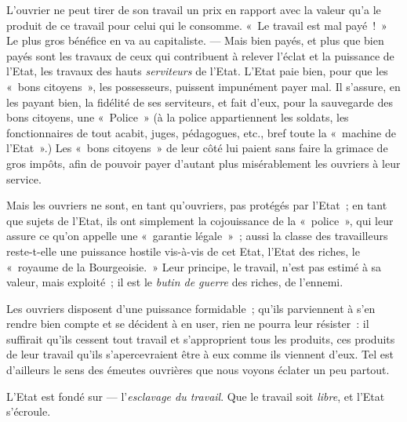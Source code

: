 \documentclass[french,twoside]{book} %
\begin{document}
L’ouvrier ne peut tirer de son travail un prix en rapport avec la valeur qu’a le produit de ce travail pour celui qui le consomme. « Le travail est mal payé ! » Le plus gros bénéfice en va au capitaliste. — Mais bien payés, et plus que bien payés sont les travaux de ceux qui contribuent à relever l’éclat et la puissance de l’Etat, les travaux des hauts \emph{serviteurs} de l’Etat. L’Etat paie bien, pour que les « bons citoyens », les possesseurs, puissent impunément payer mal. Il s’assure, en les payant bien, la fidélité de ses serviteurs, et fait d’eux, pour la sauvegarde des bons citoyens, une « Police » (à la police appartiennent les soldats, les fonctionnaires de tout acabit, juges, pédagogues, etc., bref toute la « machine de l’Etat ».) Les « bons citoyens » de leur côté lui paient sans faire la grimace de gros impôts, afin de pouvoir payer d’autant plus misérablement les ouvriers à leur service.\par
Mais les ouvriers ne sont, en tant qu’ouvriers, pas protégés par l’Etat ; en tant que sujets de l’Etat, ils ont simplement la cojouissance de la « police », qui leur assure ce qu’on appelle une « garantie légale » ; aussi la classe des travailleurs reste-t-elle une puissance  hostile vis-à-vis de cet Etat, l’Etat des riches, le « royaume de la Bourgeoisie. » Leur principe, le travail, n’est pas estimé à sa valeur, mais exploité ; il est le \emph{butin de guerre} des riches, de l’ennemi.\par
Les ouvriers disposent d’une puissance formidable ; qu’ils parviennent à s’en rendre bien compte et se décident à en user, rien ne pourra leur résister : il suffirait qu’ils cessent tout travail et s’approprient tous les produits, ces produits de leur travail qu’ils s’apercevraient être à eux comme ils viennent d’eux. Tel est d’ailleurs le sens des émeutes ouvrières que nous voyons éclater un peu partout.\par
L’Etat est fondé sur — l’\emph{esclavage du travail}. Que le travail soit \emph{libre}, et l’Etat s’écroule.
\end{document}
